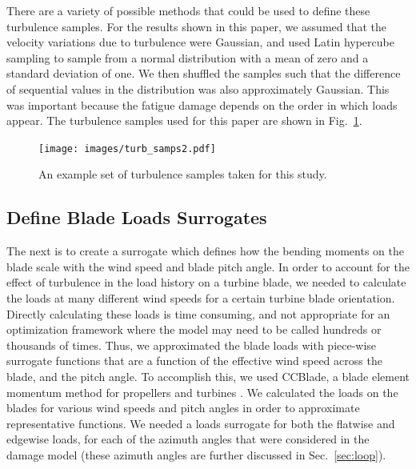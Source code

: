 \documentclass[11pt,letterpaper]{article}
\begin{document}
There are a variety of possible methods that could be used to define these turbulence samples. For the results shown in this paper, we assumed that the velocity variations due to turbulence were Gaussian, and used Latin hypercube sampling to sample from a normal distribution with a mean of zero and a standard deviation of one. We then shuffled the samples such that the difference of sequential values in the distribution was also approximately Gaussian. This was important because the fatigue damage depends on the order in which loads appear. The turbulence samples used for this paper are shown in Fig.~\ref{turb_samps}.


\begin{figure}
    \centering
    \texttt{[image: images/turb\_samps2.pdf]}
    \caption{An example set of turbulence samples taken for this study.}
    \label{turb_samps}
\end{figure}



\subsection{Define Blade Loads Surrogates}

The next is to create a surrogate which defines how the bending moments on the blade scale with the wind speed and blade pitch angle. In order to account for the effect of turbulence in the load history on a turbine blade, we needed to calculate the loads at many different wind speeds for a certain turbine blade orientation. Directly calculating these loads is time consuming, and not appropriate for an optimization framework where the model may need to be called hundreds or thousands of times. Thus, we approximated the blade loads with piece-wise surrogate functions that are a function of the effective wind speed across the blade, and the pitch angle. To accomplish this, we used CCBlade, a blade element momentum method for propellers and turbines \cite{Ning2020}. We calculated the loads on the blades for various wind speeds and pitch angles in order to approximate representative functions. We needed a loads surrogate for both the flatwise and edgewise loads, for each of the azimuth angles that were considered in the damage model (these azimuth angles are further discussed in Sec.~\ref{sec:loop}).
\end{document}
